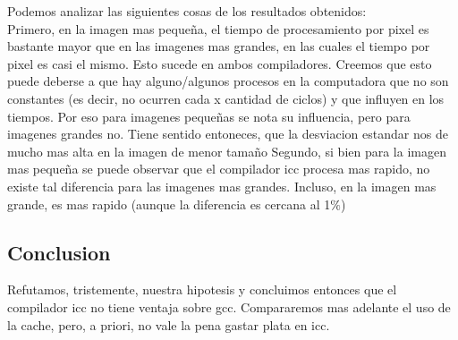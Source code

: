 Podemos analizar las siguientes cosas de los resultados obtenidos: \\
Primero, en la imagen mas pequeña, el tiempo de procesamiento por pixel es bastante mayor que en las imagenes mas grandes, en las cuales el tiempo por pixel es casi el mismo. Esto sucede en ambos compiladores. Creemos que esto puede deberse a que hay alguno/algunos procesos en la computadora que no son constantes (es decir, no ocurren cada x cantidad de ciclos) y que influyen en los tiempos. Por eso para imagenes pequeñas se nota su influencia, pero para imagenes grandes no. Tiene sentido entoneces, que la desviacion estandar nos de mucho mas alta en la imagen de menor tamaño
Segundo, si bien para la imagen mas pequeña se puede observar que el compilador icc procesa mas rapido, no existe tal diferencia para las imagenes mas grandes. Incluso, en la imagen mas grande, es mas rapido (aunque la diferencia es cercana al 1$\%$)
\subsection{Conclusion}
Refutamos, tristemente, nuestra hipotesis y concluimos entonces que el compilador icc no tiene ventaja sobre gcc. Compararemos mas adelante el uso de la cache, pero, a priori, no vale la pena gastar plata en icc.
